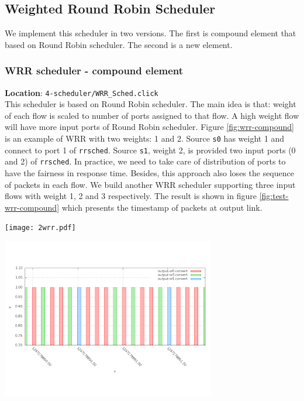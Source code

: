 \documentclass[a4paper]{article}
\begin{document}
  \subsection{Weighted Round Robin Scheduler}
  We implement this scheduler in two versions. The first is compound element that based on Round Robin scheduler. The second is a new element.
  \subsubsection{WRR scheduler - compound element}
  \textbf{Location}: \texttt{4-scheduler/WRR\_Sched.click}\\  
  This scheduler is based on Round Robin scheduler. The main idea is that: weight of each flow is scaled to number of ports assigned to that flow. A high weight flow will have more input ports of Round Robin scheduler. Figure \ref{fig:wrr-compound} is an example of WRR with two weights: 1 and 2. Source \texttt{s0} has weight 1 and connect to port 1 of \texttt{rrsched}. Source \texttt{s1}, weight 2, is provided two input ports (0 and 2) of \texttt{rrsched}. In practice, we need to take care of distribution of ports to have the fairness in response time. Besides, this approach also loses the sequence of packets in each flow. We build another WRR scheduler supporting three input flows with weight 1, 2 and 3 respectively. The result is shown in figure \ref{fig:test-wrr-compound} which presents the timestamp of packets at output link.
  \begin{center}
	\texttt{[image: 2wrr.pdf]}
	\label{fig:wrr-compound}
  \end{center}

  \begin{center}
	\includegraphics[width=0.70\textwidth]{wrr2-dense.png}
	\label{fig:test-wrr-compound}
  \end{center}
  
\end{document}
